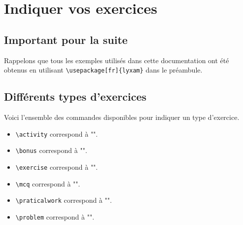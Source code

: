 \documentclass[12pt,a4paper]{scrartcl}
\makeatletter
\theoremstyle{definition}
\newcommand\@IDoptarg{\@ifstar{\@IDoptargStar}{\@IDoptargNoStar}}
\newcommand\@IDoptargStar[2]{%
	\vspace{0.5em}
	--- \texttt{#1%
		\IfStrEq{#2}{}{:}{\,#2:}%
	}%
}
\newcommand\@IDoptargNoStar[2]{%
	\IfStrEq{#2}{}{%
		\@IDoptargStar{#1}{}%
	}{%
		\@IDoptargStar{#1}{\##2}%
	}%
}
\newcommand\IDkey[1]{%
	\@IDoptarg*{Option}{{\itshape "#1"}}%
}
\makeatother
\begin{document}
\newcommand\exosoptions{
\IDkey{pts} le nombre de points avec le cas particulier de $0$ qui demande d'afficher "Non noté".

\IDkey{time} la durée de l'exercice.

\IDkey{id} un texte de votre choix pour remplacer le numéro (ceci a pour effet de bloquer temporairement la numérotation).

\IDkey{title} un titre.

\IDkey{about} une petite indication liée à l'exercice (comme par exemple qu'il ne s'adresse qu'aux élèves motivés).

\IDkey{src} la source utilisée pour confectionner l'exercice.
}


\section{Indiquer vos exercices}

    \subsection{Important pour la suite}


Rappelons que tous les exemples utilisés dans cette documentation ont été obtenus en utilisant \verb+\usepackage[fr]{lyxam}+ dans le préambule.


    \subsection{Différents types d'exercices}

Voici l'ensemble des commandes disponibles pour indiquer un type d'exercice.

\begin{itemize}
\makeatletter
    \item \verb+\activity+ correspond à "\lyxam@text@activity{}".
    
    \item \verb+\bonus+ correspond à "\lyxam@text@bonus{}".
    
    \item \verb+\exercise+ correspond à "\lyxam@text@exercise{}".
    
    \item \verb+\mcq+ correspond à "\lyxam@text@mcq{}".
    
    \item \verb+\praticalwork+ correspond à "\lyxam@text@praticalwork{}".
    
    \item \verb+\problem+ correspond à "\lyxam@text@problem{}".
\makeatother
\end{itemize}
\end{document}
